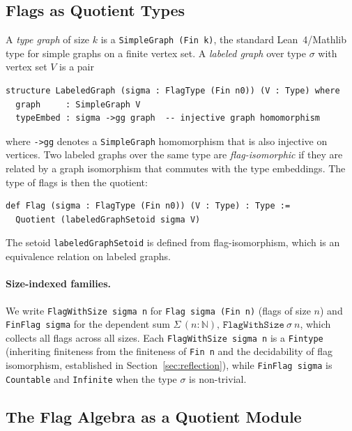 \documentclass{article}
\newcommand{\lean}[1]{\texttt{#1}}
\begin{document}
\subsection{Flags as Quotient Types}

A \emph{type graph} of size $k$ is a \lean{SimpleGraph (Fin k)}, the standard
Lean~4/Mathlib type for simple graphs on a finite vertex set.  A
\emph{labeled graph} over type $\sigma$ with vertex set $V$ is a pair
\begin{lstlisting}
structure LabeledGraph (sigma : FlagType (Fin n0)) (V : Type) where
  graph     : SimpleGraph V
  typeEmbed : sigma ->gg graph  -- injective graph homomorphism
\end{lstlisting}
where \lean{->gg} denotes a \lean{SimpleGraph} homomorphism that is also
injective on vertices.  Two labeled graphs over the same type are
\emph{flag-isomorphic} if they are related by a graph isomorphism that
commutes with the type embeddings.  The type of flags is then the quotient:
\begin{lstlisting}
def Flag (sigma : FlagType (Fin n0)) (V : Type) : Type :=
  Quotient (labeledGraphSetoid sigma V)
\end{lstlisting}
The setoid \lean{labeledGraphSetoid} is defined from flag-isomorphism,
which is an equivalence relation on labeled graphs.

\paragraph{Size-indexed families.}
We write \lean{FlagWithSize sigma n} for \lean{Flag sigma (Fin n)} (flags of size
$n$) and \lean{FinFlag sigma} for the dependent sum
$\Sigma\, (n : \mathbb{N}),\, \lean{FlagWithSize}\ \sigma\ n$, which collects
all flags across all sizes.
Each \lean{FlagWithSize sigma n} is a \lean{Fintype} (inheriting finiteness from
the finiteness of \lean{Fin n} and the decidability of flag isomorphism,
established in Section~\ref{sec:reflection}), while \lean{FinFlag sigma} is
\lean{Countable} and \lean{Infinite} when the type $\sigma$ is non-trivial.

\subsection{The Flag Algebra as a Quotient Module}
\end{document}
